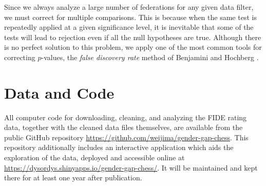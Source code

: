 \documentclass[9pt,twocolumn,twoside,lineno]{pnas-new}
\begin{document}
Since we always analyze a large number of federations for any given data filter, we must correct for multiple comparisons. This is because when the same test is repeatedly applied at a given significance level, it is inevitable that some of the tests will lead to rejection even if all the null hypotheses are true. Although there is no perfect solution to this problem, we apply one of the most common tools for correcting $p$-values, the \textit{false discovery rate} method of Benjamini and Hochberg \cite{BH95}.



\section*{Data and Code}

All computer code for downloading, cleaning, and analyzing the FIDE rating data, together with the cleaned data files themselves, are available from the public GitHub repository \url{https://github.com/weijima/gender-gap-chess}. This repository additionally includes an interactive application which aids the exploration of the data, deployed and accessible online at \url{https://dysordys.shinyapps.io/gender-gap-chess/}. It will be maintained and kept there for at least one year after publication.



\showacknow{}


\end{document}
